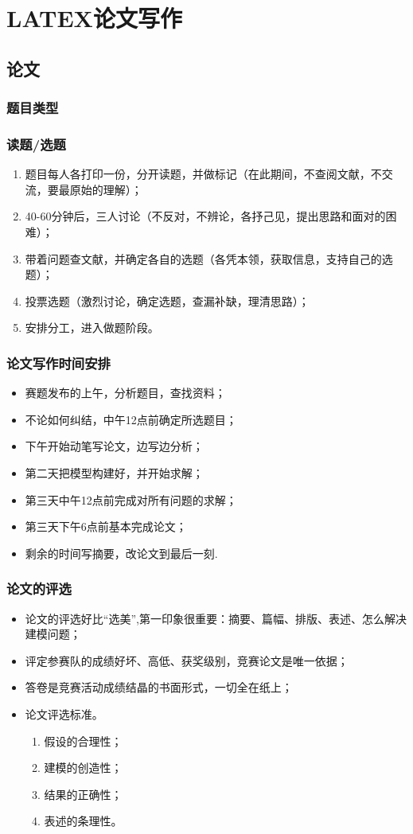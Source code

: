 \documentclass[openany]{progbookcn}
\begin{document}
\part{LATEX论文写作}
\chapter{论文}
\section{题目类型}
\section{读题/选题}
\begin{enumerate}
    \item 题目每人各打印一份，分开读题，并做标记（在此期间，不查阅文献，不交流，要最原始的理解）；
    \item 40-60分钟后，三人讨论（不反对，不辨论，各抒己见，提出思路和面对的困难）；
    \item 带着问题查文献，并确定各自的选题（各凭本领，获取信息，支持自己的选题）；
    \item 投票选题（激烈讨论，确定选题，查漏补缺，理清思路）；
    \item 安排分工，进入做题阶段。
\end{enumerate}
\section{论文写作时间安排}
\begin{itemize}
    \item 赛题发布的上午，分析题目，查找资料；
    \item 不论如何纠结，中午12点前确定所选题目；
    \item 下午开始动笔写论文，边写边分析；
    \item 第二天把模型构建好，并开始求解；
    \item 第三天中午12点前完成对所有问题的求解；
    \item 第三天下午6点前基本完成论文；
    \item 剩余的时间写摘要，改论文到最后一刻.
\end{itemize}
\section{论文的评选}
\begin{itemize}
    \item 论文的评选好比“选美”,第一印象很重要：摘要、篇幅、排版、表述、怎么解决建模问题；
    \item 评定参赛队的成绩好坏、高低、获奖级别，竞赛论文是唯一依据；
    \item 答卷是竞赛活动成绩结晶的书面形式，一切全在纸上；
    \item 论文评选标准。 
    \begin{enumerate}[itemindent=1em]
        \item 假设的合理性；
        \item 建模的创造性；
        \item 结果的正确性；
        \item 表述的条理性。
    \end{enumerate}
\end{itemize}
\end{document}
